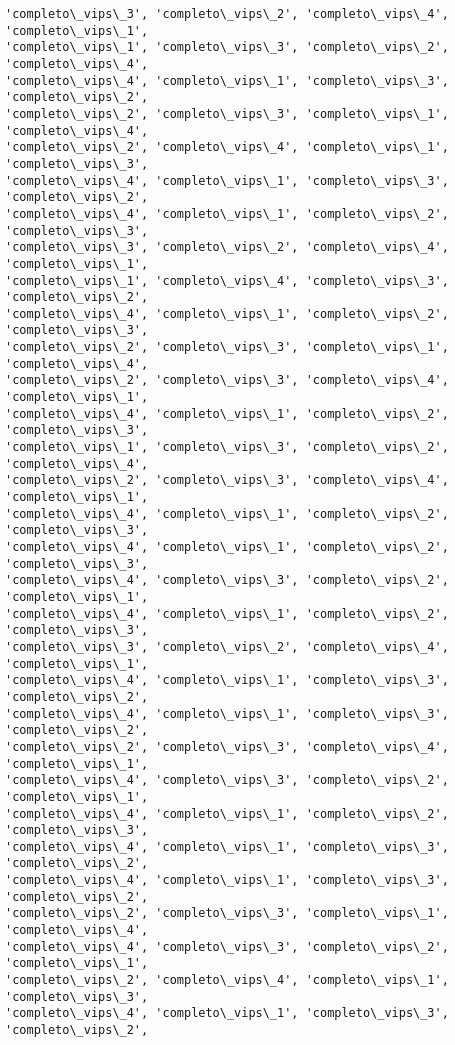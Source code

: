 \documentclass[11pt]{article}
\begin{document}
\begin{Verbatim}[commandchars=\\\{\}]
'completo\_vips\_3', 'completo\_vips\_2', 'completo\_vips\_4', 'completo\_vips\_1',
'completo\_vips\_1', 'completo\_vips\_3', 'completo\_vips\_2', 'completo\_vips\_4',
'completo\_vips\_4', 'completo\_vips\_1', 'completo\_vips\_3', 'completo\_vips\_2',
'completo\_vips\_2', 'completo\_vips\_3', 'completo\_vips\_1', 'completo\_vips\_4',
'completo\_vips\_2', 'completo\_vips\_4', 'completo\_vips\_1', 'completo\_vips\_3',
'completo\_vips\_4', 'completo\_vips\_1', 'completo\_vips\_3', 'completo\_vips\_2',
'completo\_vips\_4', 'completo\_vips\_1', 'completo\_vips\_2', 'completo\_vips\_3',
'completo\_vips\_3', 'completo\_vips\_2', 'completo\_vips\_4', 'completo\_vips\_1',
'completo\_vips\_1', 'completo\_vips\_4', 'completo\_vips\_3', 'completo\_vips\_2',
'completo\_vips\_4', 'completo\_vips\_1', 'completo\_vips\_2', 'completo\_vips\_3',
'completo\_vips\_2', 'completo\_vips\_3', 'completo\_vips\_1', 'completo\_vips\_4',
'completo\_vips\_2', 'completo\_vips\_3', 'completo\_vips\_4', 'completo\_vips\_1',
'completo\_vips\_4', 'completo\_vips\_1', 'completo\_vips\_2', 'completo\_vips\_3',
'completo\_vips\_1', 'completo\_vips\_3', 'completo\_vips\_2', 'completo\_vips\_4',
'completo\_vips\_2', 'completo\_vips\_3', 'completo\_vips\_4', 'completo\_vips\_1',
'completo\_vips\_4', 'completo\_vips\_1', 'completo\_vips\_2', 'completo\_vips\_3',
'completo\_vips\_4', 'completo\_vips\_1', 'completo\_vips\_2', 'completo\_vips\_3',
'completo\_vips\_4', 'completo\_vips\_3', 'completo\_vips\_2', 'completo\_vips\_1',
'completo\_vips\_4', 'completo\_vips\_1', 'completo\_vips\_2', 'completo\_vips\_3',
'completo\_vips\_3', 'completo\_vips\_2', 'completo\_vips\_4', 'completo\_vips\_1',
'completo\_vips\_4', 'completo\_vips\_1', 'completo\_vips\_3', 'completo\_vips\_2',
'completo\_vips\_4', 'completo\_vips\_1', 'completo\_vips\_3', 'completo\_vips\_2',
'completo\_vips\_2', 'completo\_vips\_3', 'completo\_vips\_4', 'completo\_vips\_1',
'completo\_vips\_4', 'completo\_vips\_3', 'completo\_vips\_2', 'completo\_vips\_1',
'completo\_vips\_4', 'completo\_vips\_1', 'completo\_vips\_2', 'completo\_vips\_3',
'completo\_vips\_4', 'completo\_vips\_1', 'completo\_vips\_3', 'completo\_vips\_2',
'completo\_vips\_4', 'completo\_vips\_1', 'completo\_vips\_3', 'completo\_vips\_2',
'completo\_vips\_2', 'completo\_vips\_3', 'completo\_vips\_1', 'completo\_vips\_4',
'completo\_vips\_4', 'completo\_vips\_3', 'completo\_vips\_2', 'completo\_vips\_1',
'completo\_vips\_2', 'completo\_vips\_4', 'completo\_vips\_1', 'completo\_vips\_3',
'completo\_vips\_4', 'completo\_vips\_1', 'completo\_vips\_3', 'completo\_vips\_2',

\end{Verbatim}
\end{document}
